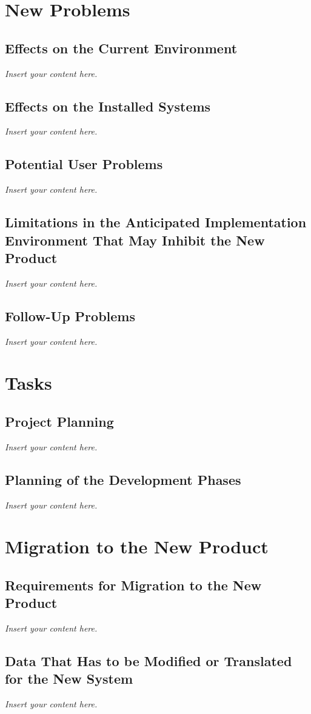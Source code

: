 \documentclass[12pt]{article}
\newcommand{\lips}{\textit{Insert your content here.}}
\begin{document}
\section{New Problems}
\subsection{Effects on the Current Environment}
\lips
\subsection{Effects on the Installed Systems}
\lips
\subsection{Potential User Problems}
\lips
\subsection{Limitations in the Anticipated Implementation Environment That May
  Inhibit the New Product}
\lips
\subsection{Follow-Up Problems}
\lips

\section{Tasks}
\subsection{Project Planning}
\lips
\subsection{Planning of the Development Phases}
\lips

\section{Migration to the New Product}
\subsection{Requirements for Migration to the New Product}
\lips
\subsection{Data That Has to be Modified or Translated for the New System}
\lips
\end{document}
